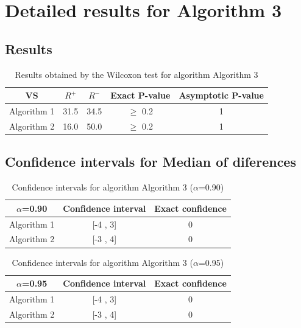 \documentclass[a4paper,10pt]{article}
\begin{document}
 \clearpage 


\section{Detailed results for Algorithm 3}


\subsection{Results}

\begin{table}[!htp]
\centering\small
\begin{tabular}{
|c|c|c|c|c|}
\hline
 VS & $R^{+}$ & $R^{-}$ & Exact P-value & Asymptotic P-value \\ \hline 
Algorithm 1 & 31.5 & 34.5 & $\geq$ 0.2 & 1\\ \hline 
Algorithm 2 & 16.0 & 50.0 & $\geq$ 0.2 & 1\\ \hline 

\end{tabular}
\caption{Results obtained by the Wilcoxon test for algorithm Algorithm 3}
\end{table}

\subsection{Confidence intervals for Median of diferences}

\begin{table}[!htp]
\centering\small
\begin{tabular}{
|c|c|c|}
\hline
 $\alpha$=0.90 & Confidence interval & Exact confidence \\ \hline 
Algorithm 1 & [-4 , 3] & 0\\ \hline 
Algorithm 2 & [-3 , 4] & 0\\ \hline 

\end{tabular}
\caption{Confidence intervals for algorithm Algorithm 3 ($\alpha$=0.90)}
\end{table}
\begin{table}[!htp]
\centering\small
\begin{tabular}{
|c|c|c|}
\hline
 $\alpha$=0.95 & Confidence interval & Exact confidence \\ \hline 
Algorithm 1 & [-4 , 3] & 0\\ \hline 
Algorithm 2 & [-3 , 4] & 0\\ \hline 

\end{tabular}
\caption{Confidence intervals for algorithm Algorithm 3 ($\alpha$=0.95)}
\end{table}

 \clearpage 
\end{document}
